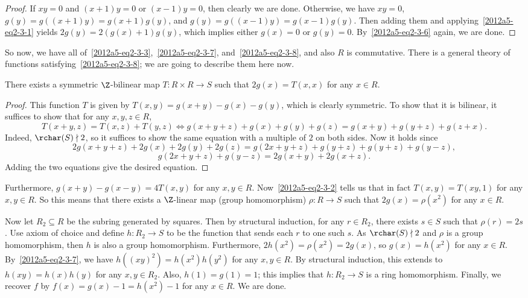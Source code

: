 \begin{itemize}
\begin{proof}
    If $xy = 0$ and $(x + 1) y = 0$ or $(x - 1) y = 0$, then clearly we are done.
    Otherwise, we have $xy = 0$, $g(y) = g((x + 1) y) = g(x + 1) g(y)$, and $g(y) = g((x - 1) y) = g(x - 1) g(y)$.
    Then adding them and applying~\eqref{2012a5-eq2-3-1} yields $2 g(y) = 2 (g(x) + 1) g(y)$, which implies either $g(x) = 0$ or $g(y) = 0$.
    By~\eqref{2012a5-eq2-3-6} again, we are done.
    \end{proof}

    So now, we have all of~\eqref{2012a5-eq2-3-3},~\eqref{2012a5-eq2-3-7}, and~\eqref{2012a5-eq2-3-8}, and also $R$ is commutative.
    There is a general theory of functions satisfying~\eqref{2012a5-eq2-3-8}; we are going to describe them here now.
    
    \begin{claim}
    There exists a symmetric $\Z$-bilinear map $T : R \times R \to S$ such that $2 g(x) = T(x, x)$ for any $x \in R$.
    \end{claim}
    \begin{proof}
    This function $T$ is given by $T(x, y) = g(x + y) - g(x) - g(y)$, which is clearly symmetric.
    To show that it is bilinear, it suffices to show that for any $x, y, z \in R$,
    \[ T(x + y, z) = T(x, z) + T(y, z) \iff g(x + y + z) + g(x) + g(y) + g(z) = g(x + y) + g(y + z) + g(z + x). \]
    Indeed, $\rchar(S) \nmid 2$, so it suffices to show the same equation with a multiple of $2$ on both sides.
    Now it holds since
    \[ 2 g(x + y + z) + 2 g(x) + 2 g(y) + 2 g(z) = g(2x + y + z) + g(y + z) + g(y + z) + g(y - z), \]
    \[ g(2x + y + z) + g(y - z) = 2 g(x + y) + 2 g(x + z). \]
    Adding the two equations give the desired equation.
    \end{proof}

    Furthermore, $g(x + y) - g(x - y) = 4 T(x, y)$ for any $x, y \in R$.
    Now~\eqref{2012a5-eq2-3-2} tells us that in fact $T(x, y) = T(xy, 1)$ for any $x, y \in R$.
    So this means that there exists a $\Z$-linear map (group homomorphism) $\rho : R \to S$ such that $2 g(x) = \rho(x^2)$ for any $x \in R$.
    
    Now let $R_2 \subseteq R$ be the subring generated by squares.
    Then by structural induction, for any $r \in R_2$, there exists $s \in S$ such that $\rho(r) = 2s$.
    Use axiom of choice and define $h : R_2 \to S$ to be the function that sends each $r$ to one such $s$.
    As $\rchar(S) \nmid 2$ and $\rho$ is a group homomorphism, then $h$ is also a group homomorphism.
    Furthermore, $2 h(x^2) = \rho(x^2) = 2 g(x)$, so $g(x) = h(x^2)$ for any $x \in R$.
    By~\eqref{2012a5-eq2-3-7}, we have $h((xy)^2) = h(x^2) h(y^2)$ for any $x, y \in R$.
    By structural induction, this extends to $h(xy) = h(x) h(y)$ for any $x, y \in R_2$.
    Also, $h(1) = g(1) = 1$; this implies that $h : R_2 \to S$ is a ring homomorphism.
    Finally, we recover $f$ by $f(x) = g(x) - 1 = h(x^2) - 1$ for any $x \in R$.
    We are done.

\end{itemize}



